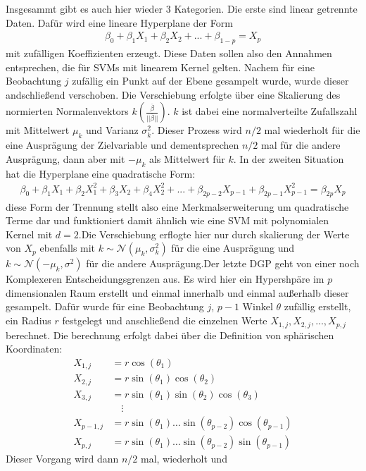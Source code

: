 \documentclass[
]{article}
\begin{document}
Insgesammt gibt es auch hier wieder 3 Kategorien. Die erste sind linear
getrennte Daten. Dafür wird eine lineare Hyperplane der Form
\begin{align*}
\beta_0+\beta_1 X_1+\beta_2 X_2 +...+\beta_{1-p} = X_p
\end{align*} mit zufälligen Koeffizienten erzeugt. Diese Daten sollen
also den Annahmen entsprechen, die für SVMs mit linearem Kernel gelten.
Nachem für eine Beobachtung \(j\) zufällig ein Punkt auf der Ebene
gesampelt wurde, wurde dieser andschließend verschoben. Die Verschiebung
erfolgte über eine Skalierung des normierten Normalenvektors
\(k\left(\frac{\overline{\beta}}{||\overline{\beta}||}\right)\). \(k\)
ist dabei eine normalverteilte Zufallszahl mit Mittelwert \(\mu_k\) und
Varianz \(\sigma^2_k\). Dieser Prozess wird \(n/2\) mal wiederholt für
die eine Ausprägung der Zielvariable und dementsprechen \(n/2\) mal für
die andere Ausprägung, dann aber mit \(-\mu_k\) als Mittelwert für
\(k\). \newline In der zweiten Situation hat die Hyperplane eine
quadratische Form: \begin{align*}
\beta_0+\beta_1 X_1 + \beta_2 X_1^2+\beta_3 X_2+\beta_4 X_2^2+...+\beta_{2p-2}X_{p-1}+\beta_{2p-1}X_{p-1}^2=\beta_{2p} X_p
\end{align*} diese Form der Trennung stellt also eine
Merkmalserweiterung um quadratische Terme dar und funktioniert damit
ähnlich wie eine SVM mit polynomialen Kernel mit \(d=2\).Die
Verschiebung erflogte hier nur durch skalierung der Werte von \(X_p\)
ebenfalls mit \(k\sim\mathcal{N}(\mu_k,\sigma^2_k)\) für die eine
Ausprägung und \(k\sim\mathcal{N}(-\mu_k,\sigma^2)\) für die andere
Ausprägung.\newline  Der letzte DGP geht von einer noch Komplexeren
Entscheidungsgrenzen aus. Es wird hier ein Hypershpäre im \(p\)
dimensionalen Raum erstellt und einmal innerhalb und einmal außerhalb
dieser gesampelt. Dafür wurde für eine Beobachtung \(j\), \(p-1\) Winkel
\(\theta\) zufällig erstellt, ein Radius \(r\) festgelegt und
anschließend die einzelnen Werte \(X_{1,j},X_{2,j},...,X_{p,j}\)
berechnet. Die berechnung erfolgt dabei über die Definition von
sphärischen Koordinaten: \begin{align*}
        X_{1,j} &= r \cos(\theta_1)\\
        X_{2,j} &= r \sin(\theta_1)\cos(\theta_2)\\
        X_{3,j} &= r \sin(\theta_1)\sin(\theta_2)\cos(\theta_3)\\
        &\quad \vdots\\
        X_{p-1,j}&=r \sin(\theta_1)\ldots \sin(\theta_{p-2})\cos(\theta_{p-1})\\
        X_{p,j}&=r \sin(\theta_1)\ldots \sin(\theta_{p-2})\sin(\theta_{p-1})
    \end{align*} Dieser Vorgang wird dann \(n/2\) mal, wiederholt und
\end{document}
